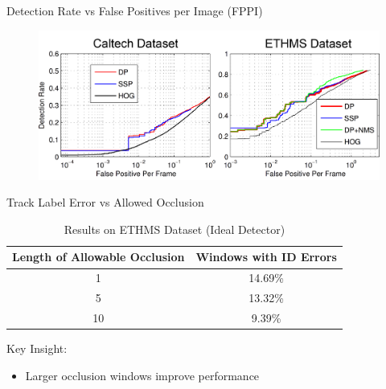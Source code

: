 \documentclass[aspectratio=43]{beamer}
\begin{document}
		
		\begin{frame}{Detection Rate vs False Positives per Image (FPPI)}
			\begin{figure}
				\centering
				\includegraphics[width=0.8\linewidth]{figures/experiments/detection_vs_fppi.png}
			\end{figure}
		\end{frame}
		
		\begin{frame}{Track Label Error vs Allowed Occlusion}
			\begin{table}
				\centering\footnotesize
				\caption{Results on ETHMS Dataset (Ideal Detector)}
				\begin{tabular}{cc}
					\hline
					Length of Allowable Occlusion & Windows with ID Errors \\ \hline
					1 & 14.69\% \\
					5 & 13.32\% \\
					10 & 9.39\% \\ \hline
				\end{tabular}
			\end{table}
			Key Insight:
			\begin{itemize}
				\item Larger occlusion windows improve performance
			\end{itemize}
		\end{frame}
		
\end{document}
